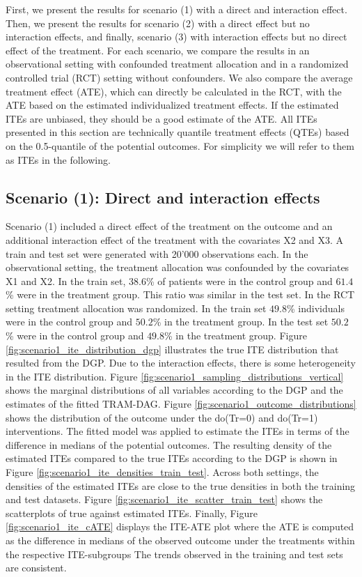 First, we present the results for scenario (1) with a direct and interaction effect. Then, we present the results for scenario (2) with a direct effect but no interaction effects, and finally, scenario (3) with interaction effects but no direct effect of the treatment. For each scenario, we compare the results in an observational setting with confounded treatment allocation and in a randomized controlled trial (RCT) setting without confounders. We also compare the average treatment effect (ATE), which can directly be calculated in the RCT, with the ATE based on the estimated individualized treatment effects. If the estimated ITEs are unbiased, they should be a good estimate of the ATE. All ITEs presented in this section are technically quantile treatment effects (QTEs) based on the 0.5-quantile of the potential outcomes. For simplicity we will refer to them as ITEs in the following.


\subsection{Scenario (1): Direct and interaction effects} 

Scenario (1) included a direct effect of the treatment on the outcome and an additional interaction effect of the treatment with the covariates X2 and X3. A train and test set were generated with 20'000 observations each. In the observational setting, the treatment allocation was confounded by the covariates X1 and X2.  In the train set, $38.6$\% of patients were in the control group and $61.4$\% were in the treatment group. This ratio was similar in the test set. In the RCT setting treatment allocation was randomized. In the train set $49.8$\% individuals were in the control group and $50.2$\% in the treatment group. In the test set $50.2$\% were in the control group and $49.8$\% in the treatment group. Figure \ref{fig:scenario1_ite_distribution_dgp} illustrates the true ITE distribution that resulted from the DGP. Due to the interaction effects, there is some heterogeneity in the ITE distribution. Figure \ref{fig:scenario1_sampling_distributions_vertical} shows the marginal distributions of all variables according to the DGP and the estimates of the fitted TRAM-DAG. Figure \ref{fig:scenario1_outcome_distributions} shows the distribution of the outcome under the do(Tr=0) and do(Tr=1) interventions. The fitted model was applied to estimate the ITEs in terms of the difference in medians of the potential outcomes. The resulting density of the estimated ITEs compared to the true ITEs according to the DGP is shown in Figure \ref{fig:scenario1_ite_densities_train_test}. Across both settings, the densities of the estimated ITEs are close to the true densities in both the training and test datasets. Figure \ref{fig:scenario1_ite_scatter_train_test} shows the scatterplots of true against estimated ITEs. Finally, Figure \ref{fig:scenario1_ite_cATE} displays the ITE-ATE plot where the ATE is computed as the difference in medians of the observed outcome under the treatments within the respective ITE-subgroups The trends observed in the training and test sets are consistent.

